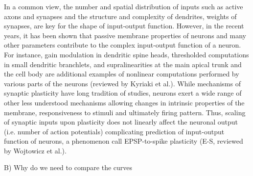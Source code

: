 \documentclass[fleqn,10pt]{wlscirep}
\begin{document}
In a common view, the number and spatial distribution of inputs such as active axons and synapses and the structure and complexity of dendrites, weights of synapses, are key for the shape of input-output function. However, in the recent years, it has been shown that passive membrane properties of neurons and many other parameters contribute to the complex input-output function of a neuron\cite{Yamazaki2022-lh}. For instance, gain modulation in dendritic spine heads, thresholded computations in small dendritic branchlets, and supralinearities at the main apical trunk and the cell body are additional examples of nonlinear computations performed by various parts of the neurons (reviewed by Kyriaki et al.\cite{Sidiropoulou2006-kh}). While mechanisms of synaptic plasticity have long tradition of studies, neurons exert a wide range of other less understood mechanisms allowing changes in intrinsic properties of the membrane, responsiveness to stimuli and ultimately firing pattern\cite{Zhang2003-ku, Yousuf2020-kp}. Thus, scaling of synaptic inputs upon plasticity does not linearly affect the neuronal output (i.e. number of action potentials) complicating prediction of input-output function of neurons, a phenomenon call EPSP-to-spike plasticity (E-S, reviewed by Wojtowicz et al.\cite{Wojtowicz2015-nb}). 

B) Why do we need to compare the curves
\end{document}
